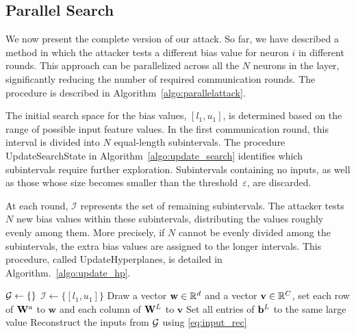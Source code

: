 \subsection{Parallel Search}
\label{sec:parallel}

We now present the complete version of our attack. So far, we have described a method 
in which the attacker tests a different bias value for neuron $i$ in different rounds. 
This approach can be parallelized across all the $N$ neurons in the layer, significantly reducing the number of required communication rounds.
The procedure is described in Algorithm~\ref{algo:parallelattack}.



The initial search space for the bias values, $[l_1, u_1]$, is determined based on the range of possible input feature values. In the first communication round, this interval is divided into $N$ equal-length subintervals. The procedure UpdateSearchState in Algorithm~\ref{algo:update_search} identifies which subintervals require further exploration. Subintervals containing no inputs, as well as those whose size becomes smaller than the threshold~$\varepsilon$, are discarded.

At each round, $\mathcal{I}$ represents the set of remaining subintervals. The attacker tests $N$ new bias values within these subintervals, distributing the values roughly evenly among them. More precisely, if $N$ cannot be evenly divided among the subintervals, the extra bias values are assigned to the longer intervals. This procedure, called UpdateHyperplanes, is detailed in Algorithm.~\ref{algo:update_hp}.


\begin{algorithm2e}[t]
\caption{Parallel attack}\label{algo:parallelattack}

$\mathcal{G} \leftarrow \{\}$\;
$\mathcal I \leftarrow \{[l_1, u_1]\}$\;
{ Draw a vector $\mathbf{w}\in \mathbb{R}^d$ and a vector $\mathbf{v}\in \mathbb{R}^C$, set each row of $\mathbf{W}^{a}$ to $\mathbf{w}$ and each column of $\mathbf{W}^{L}$ to $\mathbf{v}$}\;
Set all entries of ${\mathbf{b}}^{L}$ to the same large value\;
Reconstruct the inputs from $\mathcal{G}$ using \eqref{eq:input_rec}\;
\label{line:reconstruction}
\end{algorithm2e}

